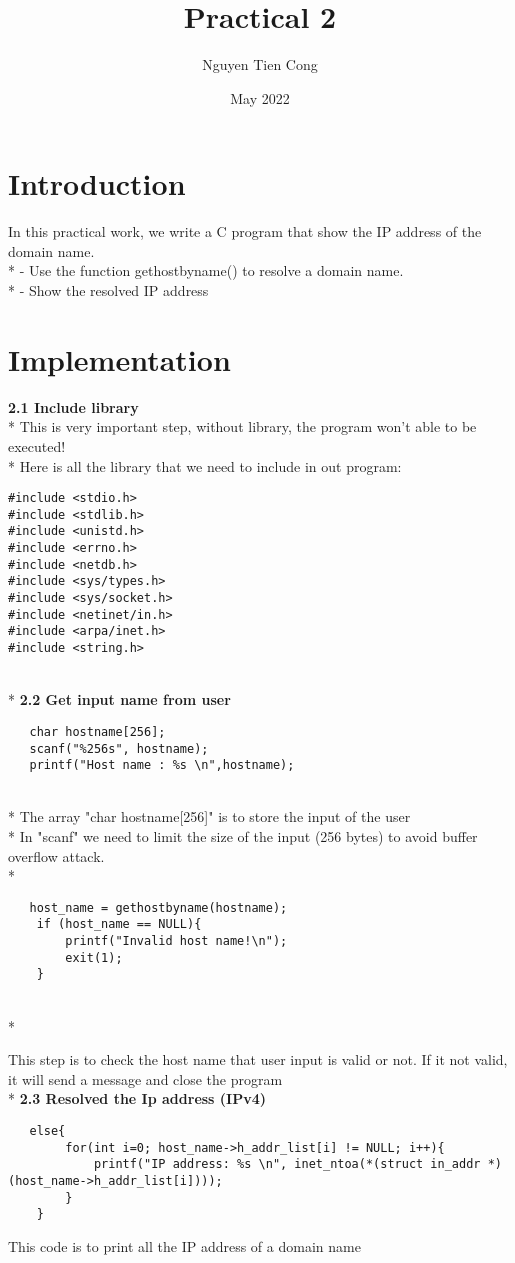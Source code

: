 \documentclass{article}
\title{Practical 2}
\author{Nguyen Tien Cong}
\date{May 2022}
\begin{document}
\maketitle

\section{Introduction}
In this practical work, we write a C program that show the IP address of the domain name.
\\*
- Use the function gethostbyname() to resolve a domain name.
\\* - Show the resolved IP address

\section{Implementation}
\textbf{2.1 Include library}
\\*
This is very important step, without library, the program won't able to be executed!
\\*
Here is all the library that we need to include in out program: 
\begin{lstlisting}
#include <stdio.h>
#include <stdlib.h>
#include <unistd.h>
#include <errno.h>
#include <netdb.h>
#include <sys/types.h>
#include <sys/socket.h>
#include <netinet/in.h>
#include <arpa/inet.h>
#include <string.h>
\end{lstlisting}
\\*
\textbf{2.2 Get input name from user}
\begin{lstlisting}
   char hostname[256];
   scanf("%256s", hostname);
   printf("Host name : %s \n",hostname);
\end{lstlisting}
\\*
The array "char hostname[256]" is to store the input of the user
\\*
In "scanf" we need to limit the size of the input (256 bytes) to avoid buffer overflow attack.
\\*
\begin{lstlisting}
   host_name = gethostbyname(hostname);
    if (host_name == NULL){
        printf("Invalid host name!\n");
        exit(1);
    }
\end{lstlisting}
\\*

This step is to check the host name that user input is valid or not. If it not valid, it will send a message and close the program
\\*
\textbf{2.3 Resolved the Ip address (IPv4)}
\begin{lstlisting}
   else{
        for(int i=0; host_name->h_addr_list[i] != NULL; i++){
            printf("IP address: %s \n", inet_ntoa(*(struct in_addr *) (host_name->h_addr_list[i])));
        }
    }
\end{lstlisting}
This code is to print all the IP address of a domain name
\end{document}
